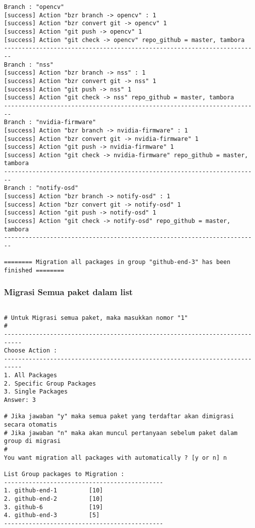 {\begin{lstlisting}[language=ShellBash2]
Branch : "opencv"
[success] Action "bzr branch -> opencv" : 1
[success] Action "bzr convert git -> opencv" 1
[success] Action "git push -> opencv" 1
[success] Action "git check -> opencv" repo_github = master, tambora
------------------------------------------------------------------------
Branch : "nss"
[success] Action "bzr branch -> nss" : 1
[success] Action "bzr convert git -> nss" 1
[success] Action "git push -> nss" 1
[success] Action "git check -> nss" repo_github = master, tambora
------------------------------------------------------------------------
Branch : "nvidia-firmware"
[success] Action "bzr branch -> nvidia-firmware" : 1
[success] Action "bzr convert git -> nvidia-firmware" 1
[success] Action "git push -> nvidia-firmware" 1
[success] Action "git check -> nvidia-firmware" repo_github = master, tambora
------------------------------------------------------------------------
Branch : "notify-osd"
[success] Action "bzr branch -> notify-osd" : 1
[success] Action "bzr convert git -> notify-osd" 1
[success] Action "git push -> notify-osd" 1
[success] Action "git check -> notify-osd" repo_github = master, tambora
------------------------------------------------------------------------

======== Migration all packages in group "github-end-3" has been finished ========

\end{lstlisting}

\subsubsection{Migrasi Semua paket dalam list}

\begin{lstlisting}[language=ShellBash2]

# Untuk Migrasi semua paket, maka masukkan nomor "1"
#
---------------------------------------------------------------------------
Choose Action : 
---------------------------------------------------------------------------
1. All Packages
2. Specific Group Packages
3. Single Packages
Answer: 3

# Jika jawaban "y" maka semua paket yang terdaftar akan dimigrasi secara otomatis
# Jika jawaban "n" maka akan muncul pertanyaan sebelum paket dalam group di migrasi
# 
You want migration all packages with automatically ? [y or n] n

List Group packages to Migration : 
---------------------------------------------
1. github-end-1         [10]
2. github-end-2         [10]
3. github-6             [19]
4. github-end-3         [5]
---------------------------------------------


\end{lstlisting}}
